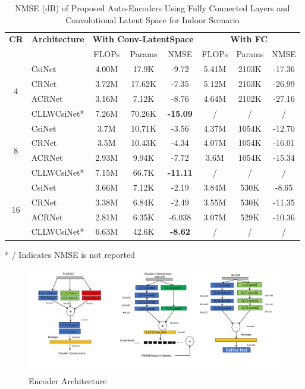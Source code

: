 \documentclass[lettersize,journal]{IEEEtran}
\begin{document}
\begin{table}[ht]
	\centering
	\caption{NMSE (dB) of Proposed Auto-Encoders Using Fully Connected Layers and Convolutional Latent Space for Indoor Scenario}
	\label{table:convlatenspacecomp}
	\begin{threeparttable}
		\begin{tabular}{clcccccc}
			\toprule
			\textbf{CR} & \textbf{Architecture} & \multicolumn{3}{c}{\textbf{With Conv-LatentSpace}} & \multicolumn{3}{c}{\textbf{With FC}} \\ 
			& & FLOPs & Params & NMSE & FLOPs & Params & NMSE \\ 
			\midrule
			\multirow{4}{*}{4} & CsiNet\cite{abe} & 4.00M & 17.9K & -9.72 & 5.41M & 2103K & -17.36 \\  
			& CRNet\cite{abn} & 3.72M & 17.62K & -7.35 & 5.12M & 2103K & -26.99 \\  
			& ACRNet\cite{abx} & 3.16M & 7.12K & -8.76 & 4.64M & 2102K & -27.16 \\
			& CLLWCsiNet* & 7.26M & 70.26K & \textbf{-15.09} & / & / & / \\ 
			\midrule
			\multirow{4}{*}{8} & CsiNet\cite{abe} & 3.7M & 10.71K & -3.56 & 4.37M & 1054K & -12.70 \\  
			& CRNet\cite{abn} & 3.5M & 10.43K & -4.34 & 4.07M & 1054K & -16.01 \\ 
			& ACRNet\cite{abx} & 2.93M & 9.94K & -7.72 & 3.6M & 1054K & -15.34 \\
			& CLLWCsiNet* & 7.15M & 66.7K & \textbf{-11.11} & / & / & / \\ 
			\midrule
			\multirow{4}{*}{16} & CsiNet\cite{abe} & 3.66M & 7.12K & -2.19 & 3.84M & 530K & -8.65 \\  
			& CRNet\cite{abn} & 3.38M & 6.84K & -2.49 & 3.55M & 530K & -11.35 \\ 
			& ACRNet\cite{abx} & 2.81M & 6.35K & -6.038 & 3.07M & 529K & -10.36 \\
			& CLLWCsiNet* & 6.63M & 42.6K & \textbf{-8.62} & / & / & / \\ 
			\bottomrule
		\end{tabular}
		\begin{tablenotes}[flushleft]
			\item[*] / Indicates NMSE is not reported
		\end{tablenotes}
	\end{threeparttable}
\end{table}


\begin{figure}[ht]
	\centering
	\includegraphics[width=0.6\linewidth]{Model_a.pdf}
	\caption{Encoder Architecture}
	\label{fig:figure1}
\end{figure}
\end{document}
